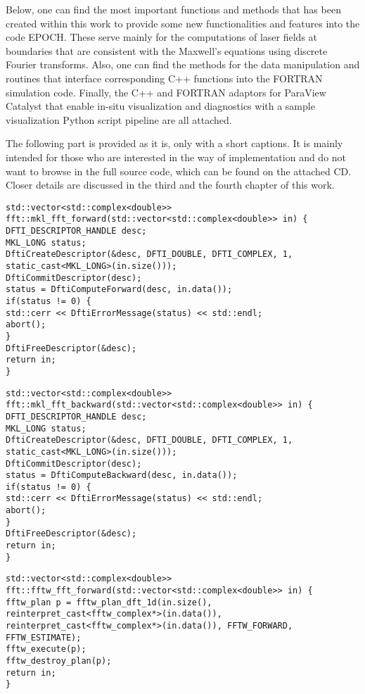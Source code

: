 Below, one can find the most important functions and methods that has been created within this work to provide some new functionalities and features into the code EPOCH. These serve mainly for the computations of laser fields at boundaries that are consistent with the Maxwell's equations using discrete Fourier transforms. Also, one can find the methods for the data manipulation and routines that interface corresponding C++ functions into the FORTRAN simulation code. Finally, the C++ and FORTRAN adaptors for ParaView Catalyst that enable in-situ visualization and diagnostics with a sample visualization Python script pipeline are all attached.

The following part is provided as it is, only with a short captions. It is mainly intended for those who are interested in the way of implementation and do not want to browse in the full source code, which can be found on the attached CD. Closer details are discussed in the third and the fourth chapter of this work.

\begin{lstlisting}[style=CXX, caption=Function performing forward fast Fourier transform using Intel$ ^{\scriptsize \textregistered} $ MKL library]
std::vector<std::complex<double>> fft::mkl_fft_forward(std::vector<std::complex<double>> in) {
DFTI_DESCRIPTOR_HANDLE desc;
MKL_LONG status;
DftiCreateDescriptor(&desc, DFTI_DOUBLE, DFTI_COMPLEX, 1, static_cast<MKL_LONG>(in.size()));
DftiCommitDescriptor(desc);
status = DftiComputeForward(desc, in.data());
if(status != 0) {
std::cerr << DftiErrorMessage(status) << std::endl;
abort();
}
DftiFreeDescriptor(&desc);
return in;
}
\end{lstlisting}

\begin{lstlisting}[style=CXX, caption=Function performing backward fast Fourier transform using Intel$ ^{\scriptsize \textregistered} $ MKL library]
std::vector<std::complex<double>> fft::mkl_fft_backward(std::vector<std::complex<double>> in) {
DFTI_DESCRIPTOR_HANDLE desc;
MKL_LONG status;
DftiCreateDescriptor(&desc, DFTI_DOUBLE, DFTI_COMPLEX, 1, static_cast<MKL_LONG>(in.size()));
DftiCommitDescriptor(desc);
status = DftiComputeBackward(desc, in.data());
if(status != 0) {
std::cerr << DftiErrorMessage(status) << std::endl;
abort();
}
DftiFreeDescriptor(&desc);
return in;
}
\end{lstlisting}

\begin{lstlisting}[style=CXX, caption=Function performing forward fast Fourier transform using FFTW library]
std::vector<std::complex<double>> fft::fftw_fft_forward(std::vector<std::complex<double>> in) {
fftw_plan p = fftw_plan_dft_1d(in.size(), reinterpret_cast<fftw_complex*>(in.data()), reinterpret_cast<fftw_complex*>(in.data()), FFTW_FORWARD, FFTW_ESTIMATE);
fftw_execute(p);
fftw_destroy_plan(p);
return in;
}
\end{lstlisting}

